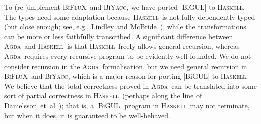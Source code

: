 \documentclass[fleqn]{llncs}
\newcommand{\BiGUL}{\textsc{BiGUL}}
\newcommand{\BiFluX}{\textsc{BiFluX}}
\newcommand{\Agda}{\textsc{Agda}}
\newcommand{\Haskell}{\textsc{Haskell}}
\newcommand{\BiYacc}{\textsc{BiYacc}}
\begin{document}
To (re-)implement \BiFluX\ and \BiYacc, we have ported |BiGUL| to \Haskell.
The types need some adaptation because \Haskell\ is not fully dependently typed (but close enough; see, e.g., Lindley and McBride~\cite{Lindley-Hasochism}), while the transformations can be more or less faithfully transcribed.
A significant difference between \Agda\ and \Haskell\ is that \Haskell\ freely allows general recursion, whereas \Agda\ requires every recursive program to be evidently well-founded.
We do not consider recursion in the \Agda\ formalisation, but we need general recursion in \BiFluX\ and \BiYacc, which is a major reason for porting |BiGUL| to \Haskell.
We believe that the total correctness proved in \Agda\ can be translated into some sort of partial correctness in \Haskell\ (perhaps along the line of Danielsson~et~al~\cite{Danielsson-fast-and-loose-reasoning}); that is, a |BiGUL| program in \Haskell\ may not terminate, but when it does, it is guaranteed to be well-behaved.


\end{document}

